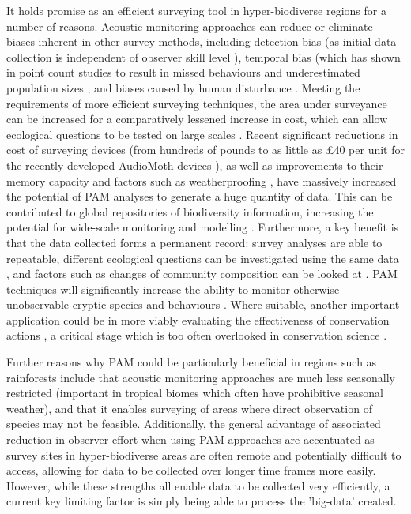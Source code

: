 \documentclass[11pt]{article}
\begin{document}
It holds promise as an efficient surveying tool in hyper-biodiverse regions for a number of reasons. Acoustic monitoring approaches can reduce or eliminate biases inherent in other survey methods, including detection bias (as initial data collection is independent of observer skill level \citep{klingbeil2015bird}), temporal bias (which has shown in point count studies to result in missed behaviours and underestimated population sizes \citep{bridges2000temporal}, and biases caused by human disturbance \citep{alldredge2007time}. Meeting the requirements of more efficient surveying techniques, the area under surveyance can be increased for a comparatively lessened increase in cost, which can allow ecological questions to be tested on large scales \citep{wrege2017acoustic}. Recent significant reductions in cost of surveying devices (from hundreds of pounds to as little as \pounds40 per unit for the recently developed AudioMoth devices \citep{hill2018audiomoth}), as well as improvements to their memory capacity and factors such as weatherproofing \citep{fanioudakis2017deep}, have massively increased the potential of PAM analyses to generate a huge quantity of data. This can be contributed to global repositories of biodiversity information, increasing the potential for wide-scale monitoring and modelling \citep{honrado2016fostering}. Furthermore, a key benefit is that the data collected forms a permanent record: survey analyses are able to repeatable, different ecological questions can be investigated using the same data \citep{newson2017potential}, and factors such as changes of community composition can be looked at \citep{rogers2013density}. PAM techniques will significantly increase the ability to monitor otherwise unobservable cryptic species and behaviours \citep{wrege2017acoustic}. Where suitable, another important application could be in more viably evaluating the effectiveness of conservation actions \citep{wrege2017acoustic}, a critical stage which is too often overlooked in conservation science \citep{ferraro2006money,legg2006most}.

Further reasons why PAM could be particularly beneficial in regions such as rainforests include that acoustic monitoring approaches are much less seasonally restricted \citep{shonfield2017autonomous} (important in tropical biomes which often have prohibitive seasonal weather), and that it enables surveying of areas where direct observation of species may not be feasible. Additionally, the general advantage of associated reduction in observer effort when using PAM approaches \citep{digby2013practical} are accentuated as survey sites in hyper-biodiverse areas are often remote and potentially difficult to access, allowing for data to be collected over longer time frames more easily. However, while these strengths all enable data to be collected very efficiently, a current key limiting factor is simply being able to process the 'big-data' created.
\end{document}
